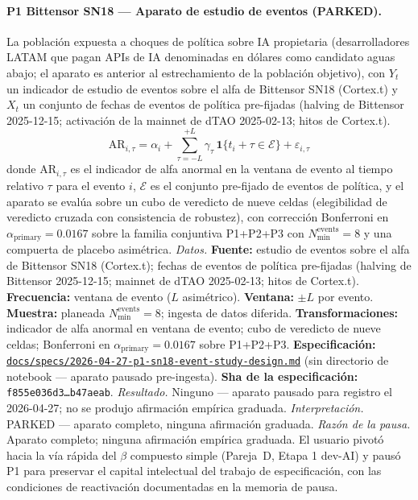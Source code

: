 \documentclass[11pt,a4paper]{article}
\theoremstyle{plain}
\begin{document}
\paragraph{P1 Bittensor SN18 --- Aparato de estudio de eventos (PARKED).}
La población expuesta a choques de política sobre IA propietaria (desarrolladores LATAM que pagan APIs de IA denominadas en dólares como candidato aguas abajo; el aparato es anterior al estrechamiento de la población objetivo), con \(Y_t\) un indicador de estudio de eventos sobre el alfa de Bittensor SN18 (Cortex.t) y \(X_t\) un conjunto de fechas de eventos de política pre-fijadas (halving de Bittensor 2025-12-15; activación de la mainnet de dTAO 2025-02-13; hitos de Cortex.t).
\[ \mathrm{AR}_{i, \tau} = \alpha_i + \sum_{\tau = -L}^{+L} \gamma_\tau\, \mathbf{1}\{t_i + \tau \in \mathcal{E}\} + \varepsilon_{i, \tau} \]
donde \(\mathrm{AR}_{i, \tau}\) es el indicador de alfa anormal en la ventana de evento al tiempo relativo \(\tau\) para el evento \(i\), \(\mathcal{E}\) es el conjunto pre-fijado de eventos de política, y el aparato se evalúa sobre un cubo de veredicto de nueve celdas (elegibilidad de veredicto cruzada con consistencia de robustez), con corrección Bonferroni en \(\alpha_{\mathrm{primary}} = 0.0167\) sobre la familia conjuntiva P1+P2+P3 con \(N_{\min}^{\mathrm{events}} = 8\) y una compuerta de placebo asimétrica.
\textit{Datos.} \textbf{Fuente:} estudio de eventos sobre el alfa de Bittensor SN18 (Cortex.t); fechas de eventos de política pre-fijadas (halving de Bittensor 2025-12-15; mainnet de dTAO 2025-02-13; hitos de Cortex.t). \textbf{Frecuencia:} ventana de evento (\(L\) asimétrico). \textbf{Ventana:} \(\pm L\) por evento. \textbf{Muestra:} planeada \(N_{\min}^{\mathrm{events}} = 8\); ingesta de datos diferida. \textbf{Transformaciones:} indicador de alfa anormal en ventana de evento; cubo de veredicto de nueve celdas; Bonferroni en \(\alpha_{\mathrm{primary}} = 0.0167\) sobre P1+P2+P3. \textbf{Especificación:} \href{https://github.com/JMSBPP/abrigo-analytics/blob/master/docs/specs/2026-04-27-p1-sn18-event-study-design.md}{\texttt{docs/specs/2026-04-27-p1-sn18-event-study-design.md}} (sin directorio de notebook --- aparato pausado pre-ingesta). \textbf{Sha de la especificación:} \texttt{f855e036d3\ldots b47aeab}.
\textit{Resultado.} Ninguno --- aparato pausado para registro el 2026-04-27; no se produjo afirmación empírica graduada.
\textit{Interpretación.} PARKED --- aparato completo, ninguna afirmación graduada.
\textit{Razón de la pausa.} Aparato completo; ninguna afirmación empírica graduada. El usuario pivotó hacia la vía rápida del \(\beta\) compuesto simple (Pareja~D, Etapa 1 dev-AI) y pausó P1 para preservar el capital intelectual del trabajo de especificación, con las condiciones de reactivación documentadas en la memoria de pausa.
\end{document}
